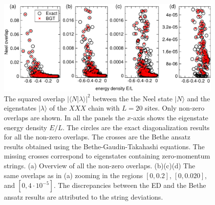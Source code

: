 \documentclass[11pt]{iopart}
\begin{document}
\begin{figure}[t]
\begin{center}
\includegraphics[width=.9\textwidth]{./draft_figs/L20_BT_check}
\end{center}
\caption{ The squared overlap $|\langle N|\lambda\rangle|^2$ between the the 
 Neel state $|N\rangle$ and the eigenstates $|\lambda\rangle$ of the $XXX$ 
 chain with $L=20$ sites. Only non-zero overlaps are shown. In all the panels the 
 $x$-axis shows the eigenstate energy density $E/L$. The circles are the exact 
 diagonalization results for all the non-zero overlaps. The crosses are the Bethe 
 ansatz results obtained using the Bethe-Gaudin-Takahashi equations. The missing 
 crosses correspond to eigenstates containing zero-momentum strings. (a) Overview 
 of all the non-zero overlaps. (b)(c)(d) The same overlaps as in (a) zooming in 
 the regions $[0,0.2]$, $[0,0.020]$, and $[0,4\cdot 10^{-5}]$. The discrepancies 
 between the ED and the Bethe ansatz results are attributed to the string 
 deviations. 
}
\label{fig1-BGT-check}
\end{figure}
\end{document}
